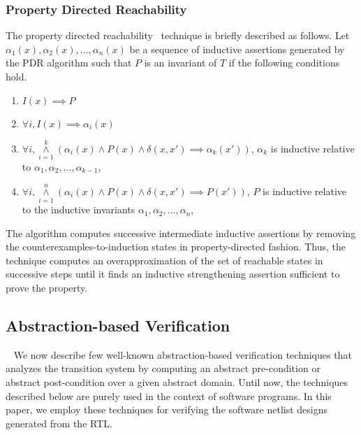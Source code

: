 \subsubsection{Property Directed Reachability} 
%
The property directed reachability~\cite{fmcad07} technique is briefly 
described as follows. 
%
Let $\alpha_1(x), \alpha_2(x),\ldots,\alpha_n(x)$ be a sequence of 
inductive assertions generated by the PDR algorithm such that 
$P$ is an invariant of $T$ if the following conditions hold.
\begin{enumerate}
 \item $I(x) \implies P$
 \item $\forall i, I(x) \implies \alpha_i(x)$
 \item $\forall i, {\overset{k}{\underset{i=1}{\wedge}}} 
	 (\alpha_i(x) \wedge P(x) \wedge \delta(x,x') \implies \alpha_k(x'))$,
 $\alpha_k$ is inductive relative to $\alpha_1, \alpha_2,\ldots,\alpha_{k-1}$,
 \item $\forall i, {\overset{n}{\underset{i=1}{\wedge}}} 
	(\alpha_i(x) \wedge P(x) \wedge \delta(x,x') \implies P(x'))$, 
 $P$ is inductive relative to the inductive invariants $\alpha_1,\alpha_2,\ldots,\alpha_n$, 
\end{enumerate}
%
The algorithm computes successive intermediate 
inductive assertions by removing the counterexamples-to-induction states in 
property-directed fashion.  Thus, the technique computes an overapproximation 
of the set of reachable states in successive steps until it finds an 
inductive strengthening assertion sufficient to prove the property. 
%
\subsection{Abstraction-based Verification}~\label{software-verif}
%
We now describe few well-known abstraction-based verification 
techniques that analyzes the transition system by computing an 
abstract pre-condition or abstract post-condition over a given 
abstract domain. Until now, the techniques described below 
are purely used in the context of software programs. In this paper, 
we employ these techniques for verifying the software netlist designs 
generated from the RTL. 
